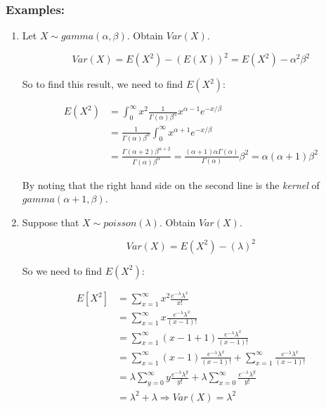 \documentclass{article}
\begin{document}
\subsubsection*{Examples:}
\begin{enumerate}
    \item Let $X \sim gamma(\alpha, \beta)$. Obtain $Var(X)$.
    
    \begin{equation*}
        Var(X) = E(X^2) - (E(X))^2 = E(X^2) - \alpha^2 \beta^2
    \end{equation*}
    
    So to find this result, we need to find $E(X^2)$:
    
    \begin{equation*}
    \begin{split}
        E(X^2) &= \int_0^\infty x^2 \frac{1}{\Gamma(\alpha)\beta^\alpha} x^{\alpha-1} e^{-x/\beta}\\
        &= \frac{1}{\Gamma(\alpha)\beta^\alpha} \int_0^\infty x^{\alpha+1} e^{-x/\beta}\\
        &= \frac{\Gamma(\alpha+2)\beta^{\alpha+2}}{\Gamma(\alpha)\beta^\alpha} =  \frac{(\alpha+1)\alpha \Gamma(\alpha)}{\Gamma(\alpha)}\beta^2 = \alpha(\alpha+1)\beta^2
    \end{split}
    \end{equation*}
    
    By noting that the right hand side on the second line is the \textit{kernel} of $gamma(\alpha+1,\beta)$.
    
    \item Suppose that $X \sim poisson(\lambda)$. Obtain $Var(X)$.
    
    \begin{equation*}
        Var(X) = E(X^2) - (\lambda)^2
    \end{equation*}
    
    So we need to find $E(X^2)$:
    
    \begin{equation*}
        \begin{split}
            E[X^2] &= \sum_{x=1}^\infty x^2 \frac{e^{-\lambda}\lambda^x}{x!}\\
                    &= \sum_{x=1}^\infty x \frac{e^{-\lambda}\lambda^x}{(x-1)!}\\
                    &= \sum_{x=1}^\infty (x-1+1) \frac{e^{-\lambda}\lambda^x}{(x-1)!}\\
                    &= \sum_{x=1}^\infty (x-1) \frac{e^{-\lambda}\lambda^x}{(x-1)!} + \sum_{x=1}^\infty \frac{e^{-\lambda}\lambda^x}{(x-1)!}\\
                    &= \lambda \sum_{y=0}^\infty y \frac{e^{-\lambda}\lambda^y}{y!} + \lambda \sum_{x=0}^\infty \frac{e^{-\lambda}\lambda^y}{y!}\\
                    &= \lambda^2 + \lambda \Rightarrow Var(X) = \lambda^2
        \end{split}
    \end{equation*}
    

\end{enumerate}
\end{document}
